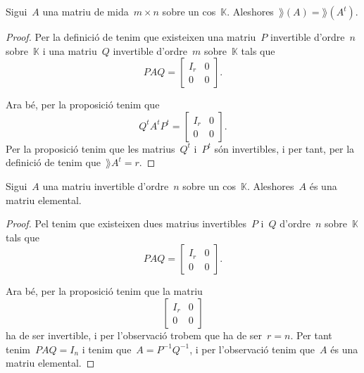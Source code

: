 \documentclass[../../main.tex]{subfiles}
\begin{document}
	\begin{proposition}
		\label{prop:rang de la matriu transposada és el rang de la matriu}
		Sigui~\(A\) una matriu de mida~\(m\times n\) sobre un cos~\(\mathbb{K}\).
		Aleshores~\(\rang(A)=\rang(A^{t})\).
		\begin{proof}
			Per la definició de  tenim que existeixen una matriu~\(P\) invertible d'ordre~\(n\) sobre~\(\mathbb{K}\) i una matriu~\(Q\) invertible d'ordre~\(m\) sobre~\(\mathbb{K}\) tals que
			\[PAQ=\left[\begin{array}{c|c}
			I_{r} & 0 \\\hline
			0 & 0
			\end{array}\right].\]

			Ara bé, per la proposició  tenim que
			\[Q^{t}A^{t}P^{t}=\left[\begin{array}{c|c}
			I_{r} & 0 \\\hline
			0 & 0
			\end{array}\right].\]
			Per la proposició  tenim que les matrius~\(Q^{t}\) i~\(P^{t}\) són invertibles, i per tant, per la definició de  tenim que~\(\rang{A^{t}}=r\).
		\end{proof}
	\end{proposition}
	\begin{proposition}
		\label{prop:una matriu invertible és producte de matrius elementals}
		Sigui~\(A\) una matriu invertible d'ordre~\(n\) sobre un cos~\(\mathbb{K}\).
		Aleshores~\(A\) és una matriu elemental.
		\begin{proof}
			Pel  tenim que existeixen dues matrius invertibles~\(P\) i~\(Q\) d'ordre~\(n\) sobre~\(\mathbb{K}\) tals que
			\[PAQ=\left[\begin{array}{c|c}
			I_{r} & 0\\\hline
			0 & 0
			\end{array}\right].\]

			Ara bé, per la proposició  tenim que la matriu
			\[\left[\begin{array}{c|c}
			I_{r} & 0\\\hline
			0 & 0
			\end{array}\right]\]
			ha de ser invertible, i per l'observació  trobem que ha de ser~\(r=n\).
			Per tant tenim~\(PAQ=I_{n}\) i tenim que~\(A=P^{-1}Q^{-1}\), i per l'observació  tenim que~\(A\) és una matriu elemental.
		\end{proof}
	\end{proposition}
\end{document}
